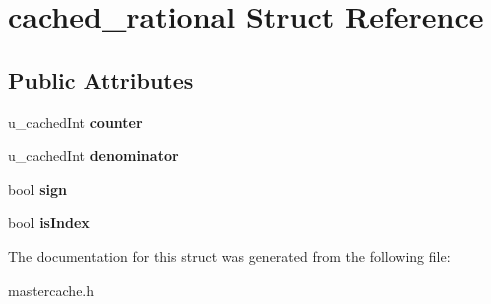 \hypertarget{structcached__rational}{}\section{cached\+\_\+rational Struct Reference}
\label{structcached__rational}
\subsection*{Public Attributes}
\begin{DoxyCompactItemize}
\item 
u\+\_\+cached\+Int {\bfseries counter}\hypertarget{structcached__rational_aae62dd75382354c815a6747301d7a667}{}\label{structcached__rational_aae62dd75382354c815a6747301d7a667}

\item 
u\+\_\+cached\+Int {\bfseries denominator}\hypertarget{structcached__rational_a20ba82fc90abd13a0273a43dd5b2a9a0}{}\label{structcached__rational_a20ba82fc90abd13a0273a43dd5b2a9a0}

\item 
bool {\bfseries sign}\hypertarget{structcached__rational_abfeb5d4e887038bd8c61f2bf35348ec0}{}\label{structcached__rational_abfeb5d4e887038bd8c61f2bf35348ec0}

\item 
bool {\bfseries is\+Index}\hypertarget{structcached__rational_a6115fc783a05187153824c855165b79c}{}\label{structcached__rational_a6115fc783a05187153824c855165b79c}

\end{DoxyCompactItemize}


The documentation for this struct was generated from the following file\+:\begin{DoxyCompactItemize}
\item 
mastercache.\+h\end{DoxyCompactItemize}
